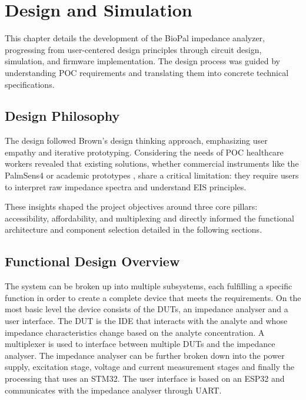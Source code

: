 \graphicspath{{design/fig/}}
\chapter{Design and Simulation}\label{chap:design}
This chapter details the development of the BioPal impedance analyzer, progressing from user-centered design principles through circuit design, simulation, and firmware implementation. The design process was guided by understanding POC requirements and translating them into concrete technical specifications.

\section{Design Philosophy}

The design followed Brown's design thinking approach\cite{brownDesignThinking2008}, emphasizing user empathy and iterative prototyping. Considering the needs of \ac{POC} healthcare workers revealed that existing solutions, whether commercial instruments like the PalmSens4 or academic prototypes \cite{buscagliaSimpleZLowCostPortable2023}\cite{ al-aliDesignPortableLowCost2017}, share a critical limitation: they require users to interpret raw impedance spectra and understand EIS principles.

These insights shaped the project objectives around three core pillars: accessibility, affordability, and multiplexing and directly informed the functional architecture and component selection detailed in the following sections.

\section{Functional Design Overview}
The system can be broken up into multiple subsystems, each fulfilling a specific function in order to create a complete device that meets the requirements. On the most basic level the device consists of the \acp{DUT}, an impedance analyser and a user interface. The DUT is the \ac{IDE} that interacts with the analyte and whose impedance characteristics change based on the analyte concentration. A multiplexer is used to interface between multiple \acp{DUT} and the impedance analyser. The impedance analyser can be further broken down into the power supply, excitation stage, voltage and current measurement stages and finally the processing that uses an STM32. The user interface is based on an ESP32 and communicates with the impedance analyser through UART.

